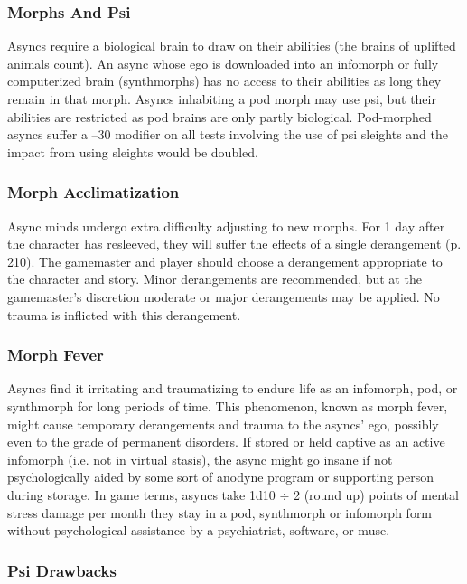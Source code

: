 \subsubsection{Morphs And Psi}

Asyncs require a biological brain to draw on their
abilities (the brains of uplifted animals count). An
async whose ego is downloaded into an infomorph or
fully computerized brain (synthmorphs) has no access
to their abilities as long they remain in that morph.
Asyncs inhabiting a pod morph may use psi, but
their abilities are restricted as pod brains are only
partly biological. Pod-morphed asyncs suffer a –30
modifier on all tests involving the use of psi sleights
and the impact from using sleights would be doubled.

\subsubsection{Morph Acclimatization}

Async minds undergo extra difficulty adjusting to new
morphs. For 1 day after the character has resleeved,
they will suffer the effects of a single derangement
(p. 210). The gamemaster and player should choose a
derangement appropriate to the character and story.
Minor derangements are recommended, but at the
gamemaster’s discretion moderate or major derangements
may be applied. No trauma is inflicted with
this derangement.

\subsubsection{Morph Fever}

Asyncs find it irritating and traumatizing to endure life
as an infomorph, pod, or synthmorph for long periods
of time. This phenomenon, known as morph fever,
might cause temporary derangements and trauma to
the asyncs’ ego, possibly even to the grade of permanent
disorders. If stored or held captive as an active
infomorph (i.e. not in virtual stasis), the async might
go insane if not psychologically aided by some sort of
anodyne program or supporting person during storage.
In game terms, asyncs take 1d10 $\div$ 2 (round up)
points of mental stress damage per month they stay
in a pod, synthmorph or infomorph form without
psychological assistance by a psychiatrist, software,
or muse.

\subsubsection{Psi Drawbacks}

